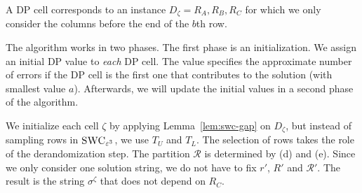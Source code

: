 A DP cell corresponds to an instance $D_\zeta = {R_A, R_B, R_C}$ for which we only consider the columns before the end of the $b$th row.

The algorithm works in two phases. 
The first phase is an initialization.
We assign an initial DP value to \emph{each} DP cell.
The value specifies the approximate number of errors if the DP cell is the first one that contributes to the solution (with smallest value $a$).
Afterwards, we will update the initial values in a second phase of the algorithm.

We initialize each cell $\zeta$ by applying Lemma~\ref{lem:swc-gap} on $D_\zeta$, but instead of sampling rows in $\textsc{SWC}_{\varepsilon^3}$, we use $T_U$ and $T_L$.
The selection of rows takes the role of the derandomization step.
The partition $\mathcal{R}$ is determined by (d) and (e).
Since we only consider one solution string, we do not have to fix $r'$, $R'$ and $\mathcal{R}'$.
The result is the string $\sigma^\zeta$ that does not depend on $R_C$.

%
%
%

